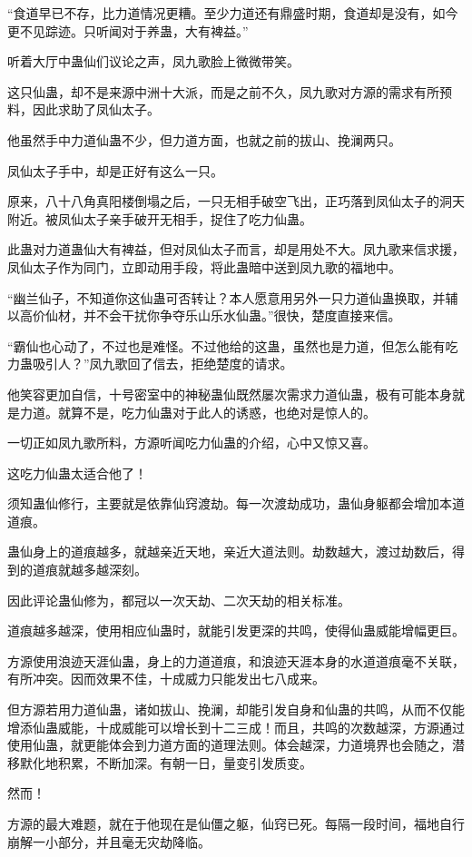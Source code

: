 \begin{this_body}
“食道早已不存，比力道情况更糟。至少力道还有鼎盛时期，食道却是没有，如今更不见踪迹。只听闻对于养蛊，大有裨益。”

听着大厅中蛊仙们议论之声，凤九歌脸上微微带笑。

这只仙蛊，却不是来源中洲十大派，而是之前不久，凤九歌对方源的需求有所预料，因此求助了凤仙太子。

他虽然手中力道仙蛊不少，但力道方面，也就之前的拔山、挽澜两只。

凤仙太子手中，却是正好有这么一只。

原来，八十八角真阳楼倒塌之后，一只无相手破空飞出，正巧落到凤仙太子的洞天附近。被凤仙太子亲手破开无相手，捉住了吃力仙蛊。

此蛊对力道蛊仙大有裨益，但对凤仙太子而言，却是用处不大。凤九歌来信求援，凤仙太子作为同门，立即动用手段，将此蛊暗中送到凤九歌的福地中。

“幽兰仙子，不知道你这仙蛊可否转让？本人愿意用另外一只力道仙蛊换取，并辅以高价仙材，并不会干扰你争夺乐山乐水仙蛊。”很快，楚度直接来信。

“霸仙也心动了，不过也是难怪。不过他给的这蛊，虽然也是力道，但怎么能有吃力蛊吸引人？”凤九歌回了信去，拒绝楚度的请求。

他笑容更加自信，十号密室中的神秘蛊仙既然屡次需求力道仙蛊，极有可能本身就是力道。就算不是，吃力仙蛊对于此人的诱惑，也绝对是惊人的。

一切正如凤九歌所料，方源听闻吃力仙蛊的介绍，心中又惊又喜。

这吃力仙蛊太适合他了！

须知蛊仙修行，主要就是依靠仙窍渡劫。每一次渡劫成功，蛊仙身躯都会增加本道道痕。

蛊仙身上的道痕越多，就越亲近天地，亲近大道法则。劫数越大，渡过劫数后，得到的道痕就越多越深刻。

因此评论蛊仙修为，都冠以一次天劫、二次天劫的相关标准。

道痕越多越深，使用相应仙蛊时，就能引发更深的共鸣，使得仙蛊威能增幅更巨。

方源使用浪迹天涯仙蛊，身上的力道道痕，和浪迹天涯本身的水道道痕毫不关联，有所冲突。因而效果不佳，十成威力只能发出七八成来。

但方源若用力道仙蛊，诸如拔山、挽澜，却能引发自身和仙蛊的共鸣，从而不仅能增添仙蛊威能，十成威能可以增长到十二三成！而且，共鸣的次数越深，方源通过使用仙蛊，就更能体会到力道方面的道理法则。体会越深，力道境界也会随之，潜移默化地积累，不断加深。有朝一日，量变引发质变。

然而！

方源的最大难题，就在于他现在是仙僵之躯，仙窍已死。每隔一段时间，福地自行崩解一小部分，并且毫无灾劫降临。


\end{this_body}
